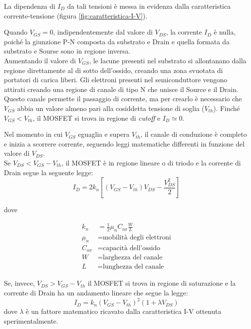 La dipendenza di $I_D$ da tali tensioni è messa in evidenza dalla caratteristica corrente-tensione (figura \ref{fig:caratteristica-I-V}).

Quando $V_{GS} = 0$, indipendentemente dal valore di $V_{DS}$, la corrente $I_D$ è nulla, poiché la giunzione P-N composta da substrato e Drain e quella formata da substrato e Sourse sono in regione inversa. \\
Aumentando il valore di $V_{GS}$, le lacune presenti nel substrato si allontanano dalla regione direttamente al di sotto dell'ossido, creando una
zona svuotata di portatori di carica liberi. Gli elettroni presenti nel semiconduttore
vengono attirati creando una regione di canale di tipo N che unisce il
Source e il Drain. Questo canale permette il passaggio di corrente, ma per crearlo è necessario che $V_{GS}$ abbia un valore almeno pari alla cosiddetta tensione di soglia ($V_{th}$). Finché $V_{GS} < V_{th}$, il MOSFET si trova in regione di \emph{cutoff} e $I_D \simeq 0$.

Nel momento in cui $V_{GS}$ eguaglia e supera $V_{th}$, il canale di conduzione è completo e inizia a scorrere corrente, seguendo leggi matematiche differenti in funzione del valore di $V_{DS}$.\\

Se $V_{DS} < V_{GS} -  V_{th}$, il MOSFET è in regione lineare o di triodo e la corrente di Drain segue la seguente legge:\\

\begin{equation}
  I_D = 2k_n\left[ \left(V_{GS}-V_{th}\right)V_{DS} - \frac{V_{DS}^2}{2}\right]
\end{equation}

dove

\begin{align*}
   k_n &= \frac{1}{2}\mu_n C_{ox}\frac{W}{L} \\
   \mu_n &= \text{mobilità degli elettroni} \\
   C_{ox} &= \text{capacità dell'ossido} \\
   W &= \text{larghezza del canale} \\
   L &= \text{lunghezza del canale}
\end{align*}

Se, invece, $V_{DS} > V_{GS} -  V_{th}$ il MOSFET si trova in regione di saturazione e la corrente di Drain ha un andamento lineare che segue la legge:\\
\begin{equation}
  I_D = k_n\left(V_{GS}-V_{th}\right)^2 (1+\lambda V_{DS})
\end{equation}
dove $\lambda$ è un fattore matematico ricavato dalla caratteristica I-V ottenuta sperimentalmente.\\

